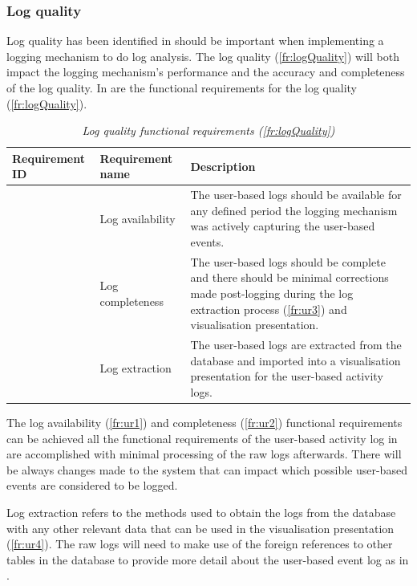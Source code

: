 \subsubsection{Log quality}
Log quality has been identified in  should be important when implementing a logging mechanism to do log analysis. The log quality (\ref{fr:logQuality}) will both impact the logging mechanism's performance and the accuracy and completeness of the log quality.  In  are the functional requirements for the log quality (\ref{fr:logQuality}).

\setcounter{phase}{3}
\setcounter{subphase}{1}
\begin{table}[!htb]
	\centering
	\small
	\caption[Log quality functional requirements (\ref{fr:logQuality})]
	{\textit{Log quality functional requirements (\ref{fr:logQuality})}}
	\label{tbl:ch2_utilisation_requirements}
	\begin{tabularx}{\textwidth}{|l|l|X|}
		\hline \textbf{Requirement ID} & \textbf{Requirement name} & \textbf{Description} \\
		\hline \subsubphase{fr:ur1} & Log availability & \RaggedRight The user-based logs should be available for any defined period the logging mechanism was actively capturing the user-based events. \\
		\hline \subsubphase{fr:ur2} & Log completeness & \RaggedRight The user-based logs should be complete and there should be minimal corrections made post-logging during the log extraction process (\ref{fr:ur3}) and visualisation presentation. \\
		\hline \subsubphase{fr:ur3} & Log extraction & \RaggedRight The user-based logs are extracted from the database and imported into a visualisation presentation for the user-based activity logs. \\
		\hline
	\end{tabularx}
\end{table}

The log availability (\ref{fr:ur1}) and completeness (\ref{fr:ur2}) functional requirements can be achieved all the functional requirements of the user-based activity log in  are accomplished with minimal processing of the raw logs afterwards. There will be always changes made to the system that can impact which possible user-based events are considered to be logged.\par Log extraction refers to the methods used to obtain the logs from the database with any other relevant data that can be used in the visualisation presentation (\ref{fr:ur4}). The raw logs will need to make use of the foreign references to other tables in the database to provide more detail about the user-based event log as in .

